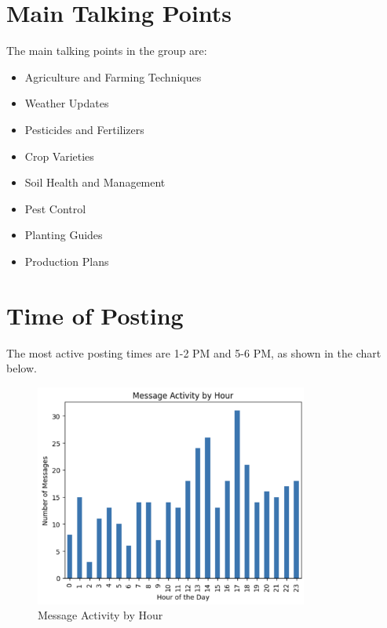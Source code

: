 \documentclass[12pt]{article}
\begin{document}
\section{Main Talking Points}
The main talking points in the group are:
\begin{itemize}
    \item Agriculture and Farming Techniques
    \item Weather Updates
    \item Pesticides and Fertilizers
    \item Crop Varieties
    \item Soil Health and Management
    \item Pest Control
    \item Planting Guides
    \item Production Plans
\end{itemize}

\section{Time of Posting}
The most active posting times are 1-2 PM and 5-6 PM, as shown in the chart below.
\begin{figure}[H]
\centering
\includegraphics[width=0.8\textwidth]{img/posting_times.png}
\caption{Message Activity by Hour}
\end{figure}
\end{document}
